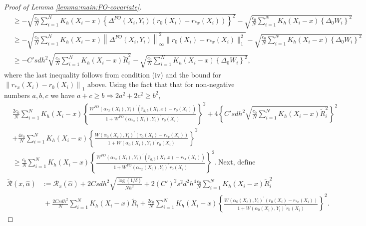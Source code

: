 \documentclass[10pt,a4paper]{amsart}
\begin{document}
\begin{proof}[Proof of Lemma \ref{lemma:main:FO-covariate}]
$$\begin{array}{rl}
&\displaystyle \geq - \sqrt{\frac{c_0}{N} \sum_{i=1}^NK_h(X_i-x)\left\{\Delta^{FO}(X_i,Y_i)(r_0(X_i)-r_{*x}(X_i))\right\}^2} - \sqrt{\frac{c_0}{N} \sum_{i=1}^NK_h(X_i-x)\left\{\Delta_0W_i\right\}^2}   \\
&\displaystyle \geq - \sqrt{\frac{c_0}{N} \sum_{i=1}^NK_h(X_i-x)\left\|\Delta^{FO}(X_i,Y_i)\right\|_\infty^2\|r_0(X_i)-r_{*x}(X_i)\|^2_1}-\sqrt{\frac{c_0}{N} \sum_{i=1}^NK_h(X_i-x)\left\{\Delta_0W_i\right\}^2}   \\
&\displaystyle \geq -C'sdh^2\sqrt{\frac{c_0}{N} \sum_{i=1}^NK_h(X_i-x) \widetilde{R}_i^2} - \sqrt{\frac{c_0}{N} \sum_{i=1}^NK_h(X_i-x)\left\{\Delta_0W_i\right\}^2},   
\end{array}$$ 
where the last inequality follows from condition (iv) and the bound for $\left\|  r_{*x}(X_i)-r_0(X_i) \right\|_1$ above. Using the fact that that for non-negative numbers $a, b, c$ we have $a+c\geq b\Rightarrow 2a^2+2c^2\geq b^2$, 
$$\begin{array}{rl}
&\displaystyle\frac{2c_0}{N}\!\!\sum_{i=1}^N\!K_h(X_i-x)\!\!\left\{\!\frac{W^{FO}(\alpha_{*x}(X_i),Y_i)^\prime(\hat{r}_{\hat a, \hat b}(X_i,x)-r_0(X_i))}{1+W^{FO}(\alpha_{*x}(X_i),Y_i)^\prime r_0(X_i)}\right\}^2 \!\!\!\!\!+\!\! 4\!\left\{\!C'sdh^2\sqrt{\frac{c_0}{N} \sum_{i=1}^NK_h(X_i-x) \widetilde{R}_i^2}\right\}^2\\
&\displaystyle + \frac{4c_0}{N} \sum_{i=1}^NK_h(X_i-x)\left\{\frac{W(\alpha_0(X_i),Y_i)^\prime(r_0(X_i)-r_{*x}(X_i))}{1+W(\alpha_0(X_i),Y_i)^\prime r_0(X_i)}\right\}^2 \\
&\displaystyle \geq\frac{c_0}{N} \sum_{i=1}^NK_h(X_i-x)\left\{\frac{W^{FO}(\alpha_{*x}(X_i),Y_i)^\prime(\hat{r}_{\hat a, \hat b}(X_i,x)-r_{*x}(X_i))}{1+W^{FO}(\alpha_{*x}(X_i),Y_i)^\prime r_0(X_i)}\right\}^2.\ \mbox{Next, define }
\end{array}$$
$$\begin{array}{rl}
\widetilde{\mathcal{R}}(x,\hat{\alpha})&\displaystyle:= \mathcal{R}_x(\hat\alpha)  + 2Csdh^2\sqrt{\frac{\log(1/\delta)}{Nh^d}}+2(C')^2s^2d^2h^4\frac{c_0}{N} \sum_{i=1}^NK_h(X_i-x)\widetilde{R}_i^2\\
&\displaystyle \ +  \frac{2Csdh^2}{N}\sum_{i=1}^N K_h(X_i-x)\widetilde{R}_i+\frac{2c_0}{N} \sum_{i=1}^NK_h(X_i-x)\left\{\frac{W(\alpha_0(X_i),Y_i)^\prime(r_0(X_i)-r_{*x}(X_i))}{1+W(\alpha_0(X_i),Y_i)^\prime r_0(X_i)}\right\}^2.
\end{array}$$

\end{proof}
\end{document}
